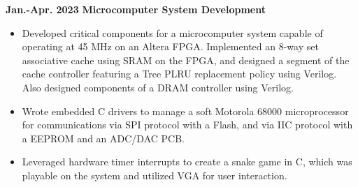 \documentclass[11pt,a4paper,sans]{moderncv}
\begin{document}
\cventry
{\textnormal{\textbf{Jan.-Apr. 2023}}}
{\textnormal{\textbf{Microcomputer System Development}}}
{}{}{}
{
    \begin{itemize}
    \item Developed critical components for a microcomputer system capable of operating at 45 MHz on an Altera FPGA. Implemented an 8-way set associative cache using SRAM on the FPGA, and designed a segment of the cache controller featuring a Tree PLRU replacement policy using Verilog. Also designed components of a DRAM controller using Verilog.
    \item Wrote embedded C drivers to manage a soft Motorola 68000 microprocessor for communications via SPI protocol with a Flash, and via IIC protocol with a EEPROM and an ADC/DAC PCB.
    \item Leveraged hardware timer interrupts to create a snake game in C, which was playable on the system and utilized VGA for user interaction.
    \end{itemize}
}


\end{document}
